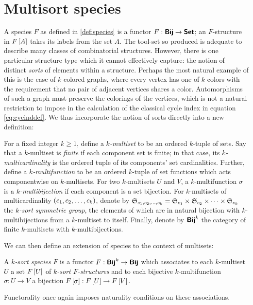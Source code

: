 \documentclass[distribution,draft]{brandiss} %
\numberwithin{section}{chapter}
\numberwithin{figure}{chapter}
\begin{document}
\section{Multisort species}\label{s:mult}
A species $F$ as defined in \ref{def:species} is a functor $F: \boldsymbol{\mathsf{Bij}} \to \boldsymbol{\mathsf{Set}}$; an $F$-structure in $F \left[ {A} \right]$ takes its labels from the set $A$.
The tool-set so produced is adequate to describe many classes of combinatorial structures.
However, there is one particular structure type which it cannot effectively capture: the notion of distinct \emph{sorts} of elements within a structure.
Perhaps the most natural example of this is the case of $k$-colored graphs, where every vertex has one of $k$ colors with the requirement that no pair of adjacent vertices shares a color.
Automorphisms of such a graph must preserve the colorings of the vertices, which is not a natural restriction to impose in the calculation of the classical cycle index in equation \eqref{eq:cycinddef}.
We thus incorporate the notion of sorts directly into a new definition:
\begin{definition} 
  \label{def:multiset}
  For a fixed integer $k \geq 1$, define a \emph{$k$-multiset} to be an ordered $k$-tuple of sets.
  Say that a $k$-multiset is \emph{finite} if each component set is finite; in that case, its \emph{$k$-multicardinality} is the ordered tuple of its components' set cardinalities.
  Further, define a \emph{$k$-multifunction} to be an ordered $k$-tuple of set functions which acts componentwise on $k$-multisets.
  For two $k$-multisets $U$ and $V$, a $k$-multifunction $\sigma$ is a \emph{$k$-multibijection} if each component is a set bijection.
  For $k$-multisets of multicardinality $\left( {c_{1}, c_{2}, \dots, c_{k}} \right)$, denote by $ \mathfrak{S}_{c_{1}, c_{2}, \dots, c_{k}}  =  \mathfrak{S}_{c_{1}}  \times  \mathfrak{S}_{c_{2}}  \times \dots \times  \mathfrak{S}_{c_{k}} $ the \emph{$k$-sort symmetric group}, the elements of which are in natural bijection with $k$-multibijections from a $k$-multiset to itself.
  Finally, denote by $\boldsymbol{\mathsf{Bij}}^{k}$ the category of finite $k$-multisets with $k$-multibijections.
\end{definition}

We can then define an extension of species to the context of multisets:
\begin{definition}
  \label{def:multisort}
  A \emph{$k$-sort species} $F$ is a functor $F: \boldsymbol{\mathsf{Bij}}^{k} \to \boldsymbol{\mathsf{Bij}}$ which associates to each $k$-multiset $U$ a set $F \left[ {U} \right]$ of \emph{$k$-sort $F$-structures} and to each bijective $k$-multifunction $\sigma: U \to V$ a bijection $F \left[ {\sigma} \right]: F \left[ {U} \right] \to F \left[ {V} \right]$.
\end{definition}
Functorality once again imposes naturality conditions on these associations.
\end{document}
